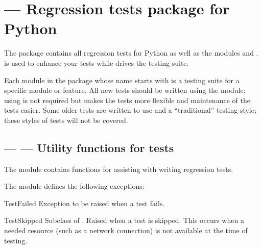 \section{ ---
         Regression tests package for Python}






The  package contains all regression tests for Python as well as
the modules  and .
 is used to enhance your tests while 
drives the testing suite.

Each module in the  package whose name starts with
 is a testing suite for a specific module or feature.
All new tests should be written using the  module; using
 is not required but makes the tests more flexible and
maintenance of the tests easier.
Some older tests are written to use  and a ``traditional''
testing style; these styles of tests will not be covered.

\begin{seealso}
\end{seealso}


\subsection{ ---
            --- Utility functions for tests}

The  module contains functions for assisting
with writing regression tests.

The  module defines the following exceptions:

\begin{excdesc}{TestFailed}
Exception to be raised when a test fails.
\end{excdesc}

\begin{excdesc}{TestSkipped}
Subclass of .
Raised when a test is skipped.
This occurs when a needed resource (such as a network connection) is not
available at the time of testing.
\end{excdesc}


